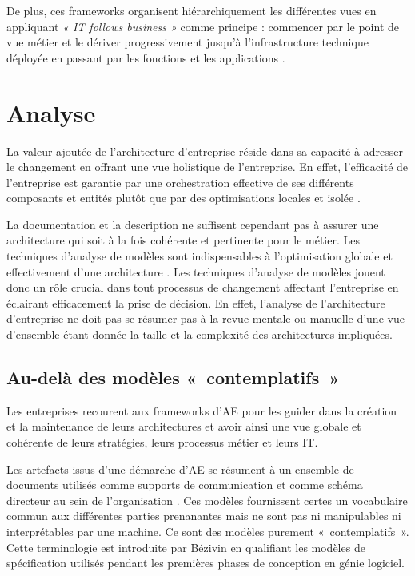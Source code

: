 De plus, ces frameworks organisent hiérarchiquement les différentes vues en appliquant \emph{« IT follows business »} comme principe : commencer par le point de vue métier et le dériver progressivement jusqu'à l'infrastructure technique déployée en passant par les fonctions et les applications \cite{winter2006essential}.


\section{Analyse}

La valeur ajoutée de l'architecture d'entreprise réside dans sa capacité à adresser le changement en offrant une vue holistique de l'entreprise. En effet, l'efficacité de l'entreprise  est garantie par une orchestration effective de ses différents composants et entités plutôt que par des optimisations locales et isolée \cite{nadler1992organizational}. 

La documentation et la description ne suffisent cependant pas à assurer une architecture qui soit à la fois cohérente et pertinente pour le métier. Les techniques d'analyse de modèles sont indispensables à l'optimisation globale et effectivement d'une architecture \cite{lankhorst2009enterprise}. Les techniques d'analyse de modèles jouent donc un rôle crucial dans tout processus de changement affectant l'entreprise en éclairant efficacement la prise de décision. En effet, l'analyse de l'architecture d'entreprise ne doit pas se résumer pas à la revue mentale ou manuelle d'une vue d'ensemble étant donnée la taille et la complexité des architectures impliquées.

	\subsection{Au-delà des modèles «~contemplatifs~»}

Les entreprises recourent aux frameworks d'AE pour les guider dans la création et la maintenance de leurs architectures et avoir ainsi une vue globale et cohérente de leurs stratégies, leurs processus métier et leurs IT.

Les artefacts issus d'une démarche d'AE se résument à un ensemble de documents utilisés comme supports de communication et comme schéma directeur au sein de l'organisation \cite{kulkarni_modelling_2013} \cite{clark_towards_2014}. Ces modèles fournissent certes un vocabulaire commun aux différentes parties prenanantes mais ne sont pas ni manipulables ni interprétables par une machine. Ce sont des modèles purement «~contemplatifs~». Cette terminologie est introduite par Bézivin en qualifiant les modèles de spécification utilisés pendant les premières phases de conception en génie logiciel. 

